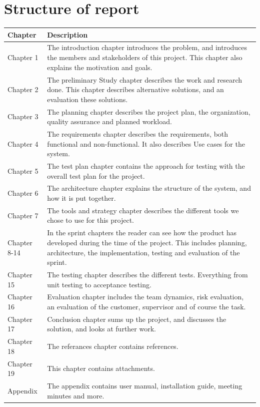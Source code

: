 \section{Structure of report}
\begin{tabular}{l|p{10cm}}
\textbf{Chapter} & \textbf{Description} \\
\hline
Chapter 1 & The introduction chapter introduces the problem, and introduces the members and stakeholders of this project.
This chapter also explains the motivation and goals. \\
\hline
Chapter 2 &  The preliminary Study chapter describes the work and research done. This chapter describes alternative solutions, and an evaluation these solutions. \\
\hline
Chapter 3 &  The planning chapter describes the project plan, the organization, quality assurance and planned workload.  \\
\hline
Chapter 4 &  The requirements chapter describes the requirements, both functional and non-functional. It also describes Use cases for the system. \\
\hline
Chapter 5 &  The test plan chapter contains the approach for testing with the overall test plan for the project.\\
\hline
Chapter 6	 &  The architecture chapter explains the structure of the system, and how it is put together. \\
\hline
Chapter 7	 &   The tools and strategy chapter describes the different tools we chose to use for this project.\\
\hline
Chapter 8-14 	&  In the sprint chapters the reader can see how the product has developed during the time of the project. This includes planning, architecture, the implementation, testing and evaluation of the sprint. \\
\hline
Chapter 15 	 &  The testing chapter describes the different tests. Everything from unit testing to acceptance testing. \\
\hline
Chapter 16 	 &  Evaluation chapter includes the team dynamics, risk evaluation, an evaluation of the customer, supervisor and of course the task. \\
\hline
Chapter 17 	 &  Conclusion chapter sums up the project, and discusses the solution, and looks at further work. \\
\hline
Chapter 18 	 &  The referances chapter contains references. \\
\hline
Chapter 19 	 &  This chapter contains attachments. \\
\hline
Appendix 	 &   The appendix contains user manual, installation guide, meeting minutes and more.\\

\hline
\end{tabular}

